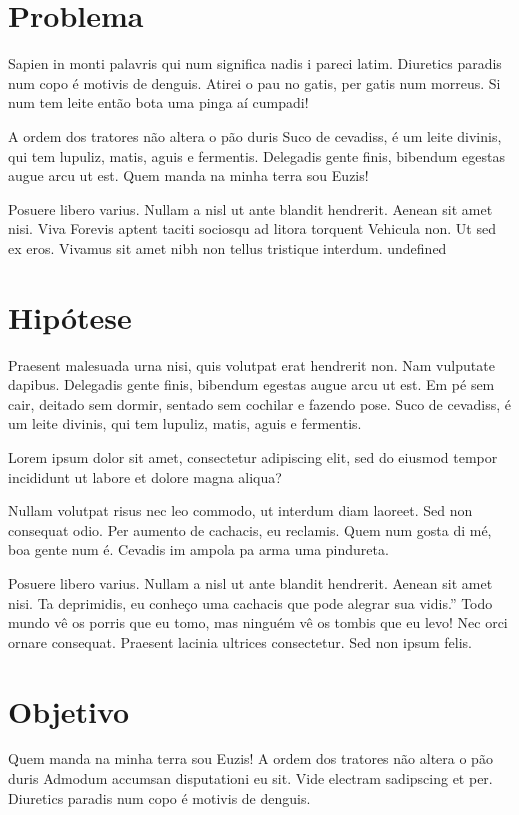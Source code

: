 \section{Problema} \label{sec:problema}
Sapien in monti palavris qui num significa nadis i pareci latim. Diuretics paradis num copo é motivis de denguis. Atirei o pau no gatis, per gatis num morreus. Si num tem leite então bota uma pinga aí cumpadi!

A ordem dos tratores não altera o pão duris Suco de cevadiss, é um leite divinis, qui tem lupuliz, matis, aguis e fermentis. Delegadis gente finis, bibendum egestas augue arcu ut est. Quem manda na minha terra sou Euzis!

Posuere libero varius. Nullam a nisl ut ante blandit hendrerit. Aenean sit amet nisi. Viva Forevis aptent taciti sociosqu ad litora torquent Vehicula non. Ut sed ex eros. Vivamus sit amet nibh non tellus tristique interdum. undefined 

\section{Hipótese} \label{sec:hipotese}
Praesent malesuada urna nisi, quis volutpat erat hendrerit non. Nam vulputate dapibus. Delegadis gente finis, bibendum egestas augue arcu ut est. Em pé sem cair, deitado sem dormir, sentado sem cochilar e fazendo pose. Suco de cevadiss, é um leite divinis, qui tem lupuliz, matis, aguis e fermentis.
\begin{hipo}
Lorem ipsum dolor sit amet, consectetur adipiscing elit, sed do eiusmod tempor incididunt ut labore et dolore magna aliqua?
\end{hipo}



Nullam volutpat risus nec leo commodo, ut interdum diam laoreet. Sed non consequat odio. Per aumento de cachacis, eu reclamis. Quem num gosta di mé, boa gente num é. Cevadis im ampola pa arma uma pindureta.

Posuere libero varius. Nullam a nisl ut ante blandit hendrerit. Aenean sit amet nisi. Ta deprimidis, eu conheço uma cachacis que pode alegrar sua vidis.” Todo mundo vê os porris que eu tomo, mas ninguém vê os tombis que eu levo! Nec orci ornare consequat. Praesent lacinia ultrices consectetur. Sed non ipsum felis. 

\section{Objetivo} \label{sec:obj}
Quem manda na minha terra sou Euzis! A ordem dos tratores não altera o pão duris Admodum accumsan disputationi eu sit. Vide electram sadipscing et per. Diuretics paradis num copo é motivis de denguis.

